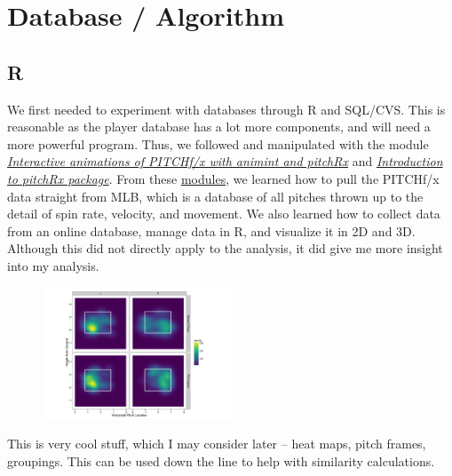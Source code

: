 \documentclass[12pt]{article}
\numberwithin{equation}{subsection}
\begin{document}
\section{Database / Algorithm}
\subsection{R}
We first needed to experiment with databases through R and SQL/CVS. This is reasonable as the player database has a lot more components, and will need a more powerful program.
Thus, we followed and manipulated with the module \href{http://cpsievert.github.io/baseballR/20140818/}{\textit{Interactive animations of PITCHf/x with animint and pitchRx}} and \href{http://cpsievert.github.io/pitchRx/}{\textit{Introduction to pitchRx package}}. From these \href{https://www.datascienceriot.com/how-to-create-a-pitchfx-database-with-pitchrx-and-r/kris/}{modules}, we learned how to pull the PITCHf/x data straight from MLB, which is a database of all pitches thrown up to the detail of spin rate, velocity, and movement. We also learned how to collect data from an online database, manage data in R, and visualize it in 2D and 3D. Although this did not directly apply to the analysis, it did give me more insight into my analysis. 
\begin{figure}[H]
	\centering
	\includegraphics[width=0.5\textwidth]{index}
\end{figure}
This is very cool stuff, which I may consider later -- heat maps, pitch frames, groupings. This can be used down the line to help with similarity calculations. 
\end{document}
